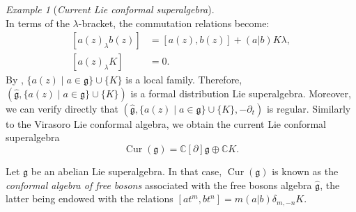 \documentclass[a4paper, 12pt, reqno]{amsart}
\theoremstyle{remark}
\newtheorem{example}[theorem]{Example}
\DeclareMathOperator{\Cur}{Cur}
\begin{document}
\begin{example}[\emph{Current Lie conformal superalgebra}]
\begin{equation*}
  \end{equation*}
  In terms of the $\lambda$-bracket, the commutation relations become:
  \begin{equation*}
    \begin{split}
      [a(z)_{\lambda}b(z)] &= [a(z), b(z)] + (a| b)K\lambda, \\
      [a(z)_{\lambda}K] &= 0.
    \end{split}
  \end{equation*}
  By , $\{a(z) \mid a \in \mathfrak{g}\} \cup \{K\}$ is a local family.
  Therefore, $(\hat{\mathfrak{g}}, \{a(z) \mid a \in \mathfrak{g}\} \cup \{K\})$ is a formal distribution Lie superalgebra.
  Moreover, we can verify directly that $(\hat{\mathfrak{g}}, \{a(z) \mid a \in \mathfrak{g}\} \cup \{K\}, -\partial_t)$ is regular.
  Similarly to the Virasoro Lie conformal algebra, we obtain the current Lie conformal superalgebra
  \begin{equation*}
    \Cur(\mathfrak{g}) = \mathbb{C}[\partial]\mathfrak{g} \oplus \mathbb{C}K.
  \end{equation*}

  Let $\mathfrak{g}$ be an abelian Lie superalgebra.
  In that case, $\Cur(\mathfrak{g})$ is known as the \emph{conformal algebra of free bosons} associated with the free bosons algebra $\hat{\mathfrak{g}}$, the latter being endowed with the relations $[at^m, bt^n] = m(a| b)\delta_{m, -n}K$.
\end{example}
\end{document}
